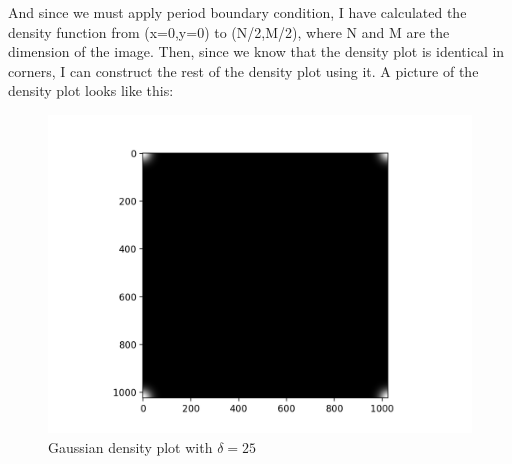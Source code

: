 \documentclass[12pt,letterpaper]{article}
\begin{document}
\begin{enumerate}
    And since we must apply period boundary condition, I have calculated the density function from (x=0,y=0) to (N/2,M/2), where N and M are the dimension of the image. Then, since we know that the density plot is identical in corners, I can construct the rest of the density plot using it. A picture of the density plot looks like this:
    \begin{figure}[h]
    \centering
    \includegraphics[width=1.\linewidth]{q2b.png}
    \caption{Gaussian density plot with $\delta=25$}
    \end{figure}
    
    


\end{enumerate}
\end{document}
